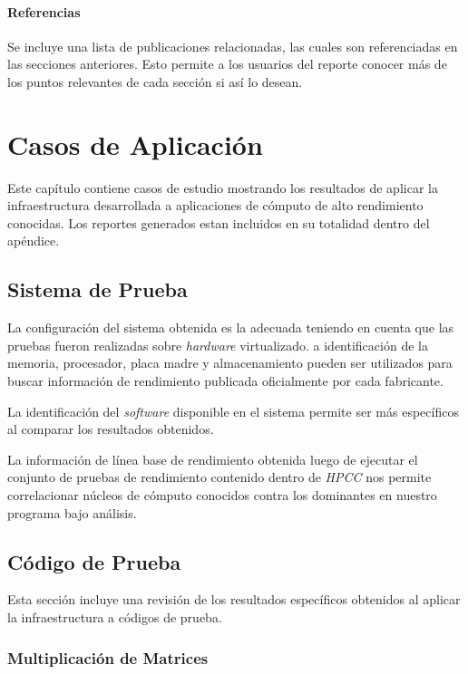 \documentclass[a4paper]{report}
\begin{document}
\subsubsection{Referencias}

Se incluye una lista de publicaciones relacionadas, las cuales son referenciadas en las secciones anteriores.
Esto permite a los usuarios del reporte conocer más de los puntos relevantes de cada sección si así lo desean.

\chapter{Casos de Aplicación} \label{Casos de Aplicacion}

Este capítulo contiene casos de estudio mostrando los resultados de aplicar la infraestructura desarrollada a aplicaciones de cómputo de alto rendimiento conocidas. Los reportes generados estan incluidos en su totalidad dentro del apéndice.

\section{Sistema de Prueba}

La configuración del sistema obtenida es la adecuada teniendo en cuenta que las pruebas fueron realizadas sobre {\it hardware} virtualizado.
a identificación de la memoria, procesador, placa madre y almacenamiento pueden ser utilizados para buscar información de rendimiento publicada oficialmente por cada fabricante.

\bigskip

La identificación del {\it software} disponible en el sistema permite ser más específicos al comparar los resultados obtenidos.

\bigskip

La información de línea base de rendimiento obtenida luego de ejecutar el conjunto de pruebas de rendimiento contenido dentro de {\it HPCC} nos permite correlacionar núcleos de cómputo conocidos contra los dominantes en nuestro programa bajo análisis.

\section{Código de Prueba}

Esta sección incluye una revisión de los resultados específicos obtenidos al aplicar la infraestructura a códigos de prueba.

\subsection{Multiplicación de Matrices}
\end{document}
